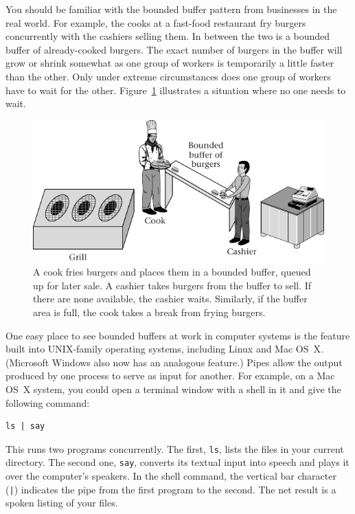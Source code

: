You should be familiar with the bounded buffer pattern from businesses
in the real world.  For example, the cooks at a fast-food
restaurant fry burgers concurrently with the cashiers selling them.
In between the two is a bounded buffer of already-cooked burgers.
The exact number of burgers in the buffer will grow or shrink somewhat
as one group of workers is temporarily a little faster than the
other.  Only under extreme circumstances does one group of workers
have to wait for the other.  Figure~\ref{scan-4-7} illustrates a situation where no one needs to wait.
\begin{figure}
\centerline{\includegraphics{hail_f0414}}
\caption{A cook fries burgers and places them in a bounded buffer,
  queued up for later sale.  A cashier takes burgers from the
  buffer to sell.  If there are none available, the cashier waits.
  Similarly, if the buffer area is full, the cook takes a break from
  frying burgers.}
\label{scan-4-7}
\end{figure}


One easy place to see bounded buffers at work in computer systems is
the  feature built into UNIX-family operating systems,
including Linux and Mac OS~X.  (Microsoft Windows also now has an
analogous feature.)  Pipes allow the output produced by one process to
serve as input for another.  For example, on a Mac OS~X
system, you could open a terminal window with a shell in it and give the following command:
\begin{verbatim}
ls | say
\end{verbatim}
This runs two programs concurrently.  The first, \verb|ls|,
lists
the files in your current directory. 
The second one, \verb|say|, converts its textual input into speech and
plays it over the computer's speakers.   In the shell
command, the vertical bar character (\verb:|:) indicates the pipe from
the first program to the second. The net result is a spoken
listing of your files.

